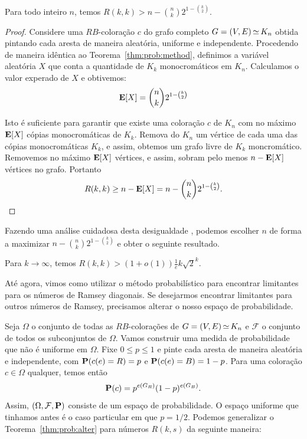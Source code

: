 \begin{theorem}
\label{thm:prob:alter}
Para todo inteiro $n$, temos $\displaystyle R(k,k) > n - \binom{n}{k}2^{1 - \binom{k}{2}}$.
\end{theorem}
\begin{proof}
Considere uma $RB$-coloração $c$ do grafo completo $G = (V,E) \operatorname{\simeq} K_n$ obtida pintando cada aresta de maneira aleatória, uniforme e independente. Procedendo de maneira idêntica ao Teorema~\ref{thm:prob:method}, definimos a variável aleatória $X$ que conta a quantidade de $K_k$ monocromáticos em $K_n$. Calculamos o valor experado de $X$ e obtivemos:
\[ \operatorname{\mathbf{E}}[X] = \binom{n}{k} 2^{1 - \binom{k}{2}} \]

Isto é suficiente para garantir que existe uma coloração $c$ de $K_n$ com no máximo $\operatorname{\mathbf{E}}[X]$ cópias monocromáticas de $K_k$. Remova do $K_n$ um vértice de cada uma das cópias monocromáticas $K_k$, e assim, obtemos um grafo livre de $K_k$ moncromático. Removemos no máximo $\operatorname{\mathbf{E}}[X]$ vértices, e assim, sobram pelo menos $n - \operatorname{\mathbf{E}}[X]$ vértices no grafo. Portanto
\[ R(k,k) \geq n - \operatorname{\mathbf{E}}[X] = n - \binom{n}{k} 2^{1 - \binom{k}{2}}.  \qedhere\]
\end{proof}

Fazendo uma análise cuidadosa desta desigualdade \cite{spencer2014asymptopia}, podemos escolher $n$ de forma a maximizar $n - \binom{n}{k}2^{1 - \binom{k}{2}}$ e obter o seguinte resultado.

\begin{corollary}
Para $k \to \infty$, temos $\displaystyle R(k,k) > (1+o(1))\frac{1}{e}k\sqrt{2}^k$.
\end{corollary}

Até agora, vimos como utilizar o método probabilístico para encontrar limitantes para os números de Ramsey diagonais. Se desejarmos encontrar limitantes para outros números de Ramsey, precisamos alterar o nosso espaço de probabilidade.

Seja $\Omega$ o conjunto de todas as $RB$-colorações de $G = (V,E) \operatorname{\simeq} K_n$ e $\mathcal{F}$ o conjunto de todos os subconjuntos de $\Omega$. Vamos construir uma medida de probabilidade que não é uniforme em $\Omega$. Fixe $0 \leq p \leq 1$ e pinte cada aresta de maneira aleatória e independente, com $\operatorname{\mathbf{P}}(c(e) = R) = p$ e $\operatorname{\mathbf{P}}(c(e) = B) = 1 - p$. Para uma coloração $c \in \Omega$ qualquer, temos então
\[ \operatorname{\mathbf{P}}(c) =  p^{e(G_R)}(1-p)^{e(G_B)}.\]
Assim, $(\Omega, \mathcal{F}, \operatorname{\mathbf{P}})$ consiste de um espaço de probabilidade. O espaço uniforme que tinhamos antes é o caso particular em que $p = 1/2$. Podemos generalizar o Teorema~\ref{thm:prob:alter} para números $R(k,s)$ da seguinte maneira:

